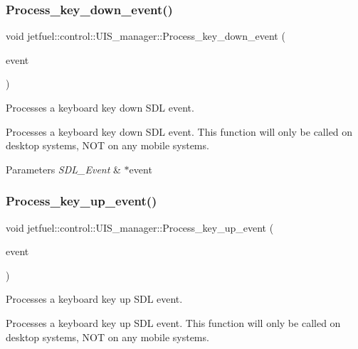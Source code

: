 \subsubsection{\texorpdfstring{Process\+\_\+key\+\_\+down\+\_\+event()}{Process\_key\_down\_event()}}
{\footnotesize\ttfamily void jetfuel\+::control\+::\+U\+I\+S\+\_\+manager\+::\+Process\+\_\+key\+\_\+down\+\_\+event (\begin{DoxyParamCaption}\item[{S\+D\+L\+\_\+\+Event $\ast$}]{event }\end{DoxyParamCaption})\hspace{0.3cm}{\ttfamily [protected]}}



Processes a keyboard key down S\+DL event. 

Processes a keyboard key down S\+DL event. This function will only be called on desktop systems, N\+OT on any mobile systems.


\begin{DoxyParams}{Parameters}
{\em S\+D\+L\+\_\+\+Event} & $\ast$event \\
\hline
\end{DoxyParams}
\mbox{\label{classjetfuel_1_1control_1_1UIS__manager_a43156fbe06f42df6cdeef4f3c5baa253}} 
\subsubsection{\texorpdfstring{Process\+\_\+key\+\_\+up\+\_\+event()}{Process\_key\_up\_event()}}
{\footnotesize\ttfamily void jetfuel\+::control\+::\+U\+I\+S\+\_\+manager\+::\+Process\+\_\+key\+\_\+up\+\_\+event (\begin{DoxyParamCaption}\item[{S\+D\+L\+\_\+\+Event $\ast$}]{event }\end{DoxyParamCaption})\hspace{0.3cm}{\ttfamily [protected]}}



Processes a keyboard key up S\+DL event. 

Processes a keyboard key up S\+DL event. This function will only be called on desktop systems, N\+OT on any mobile systems.


